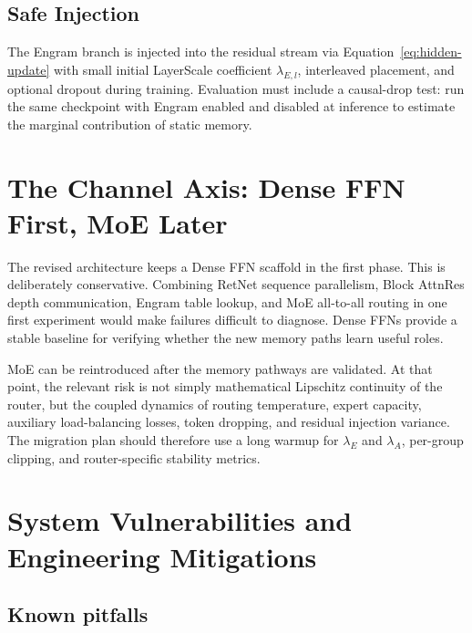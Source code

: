 \documentclass[11pt]{article}
\begin{document}
\subsection{Safe Injection}

The Engram branch is injected into the residual stream via Equation~\eqref{eq:hidden-update} with small initial LayerScale coefficient $\lambda_{E,l}$, interleaved placement, and optional dropout during training. Evaluation must include a causal-drop test: run the same checkpoint with Engram enabled and disabled at inference to estimate the marginal contribution of static memory.

\section{The Channel Axis: Dense FFN First, MoE Later}

The revised architecture keeps a Dense FFN scaffold in the first phase. This is deliberately conservative. Combining RetNet sequence parallelism, Block AttnRes depth communication, Engram table lookup, and MoE all-to-all routing in one first experiment would make failures difficult to diagnose. Dense FFNs provide a stable baseline for verifying whether the new memory paths learn useful roles.

MoE can be reintroduced after the memory pathways are validated. At that point, the relevant risk is not simply mathematical Lipschitz continuity of the router, but the coupled dynamics of routing temperature, expert capacity, auxiliary load-balancing losses, token dropping, and residual injection variance. The migration plan should therefore use a long warmup for $\lambda_E$ and $\lambda_A$, per-group clipping, and router-specific stability metrics.

\section{System Vulnerabilities and Engineering Mitigations}

\subsection{Known pitfalls}
\end{document}
